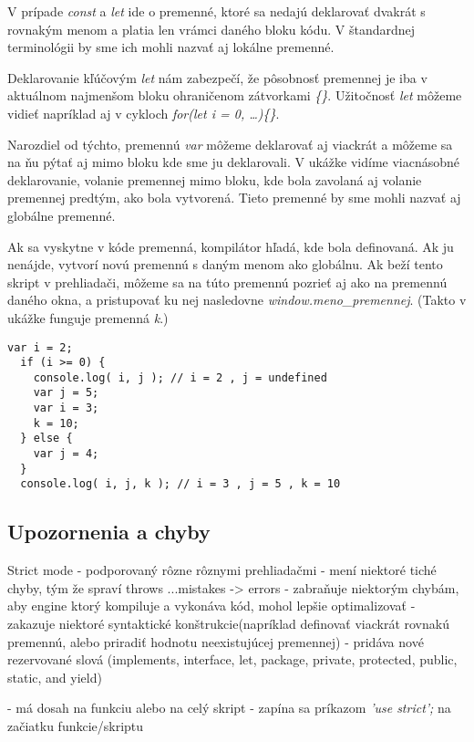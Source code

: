 V prípade \emph{const} a \emph{let} ide o premenné, ktoré sa nedajú deklarovať dvakrát s rovnakým menom a platia len vrámci daného bloku kódu. V štandardnej terminológii by sme ich mohli nazvať aj lokálne premenné. 

Deklarovanie kľúčovým \emph{let} nám zabezpečí, že pôsobnosť premennej je iba v aktuálnom najmenšom bloku ohraničenom zátvorkami \emph{\{\}}. Užitočnosť \emph{let} môžeme vidieť napríklad aj v cykloch \emph{for(let i = 0, \ldots)\{\}}.

Narozdiel od týchto, premennú \emph{var} môžeme deklarovať aj viackrát a môžeme sa na ňu pýtať aj mimo bloku kde sme ju deklarovali. V ukážke vidíme viacnásobné deklarovanie, volanie premennej mimo bloku, kde bola zavolaná aj volanie premennej predtým, ako bola vytvorená. Tieto premenné by sme mohli nazvať aj globálne premenné. 

Ak sa vyskytne v kóde premenná, kompilátor hľadá, kde bola definovaná. Ak ju nenájde, vytvorí novú premennú s daným menom ako globálnu. Ak beží tento skript v prehliadači, môžeme sa na túto premennú pozrieť aj ako na premennú daného okna, a pristupovať ku nej nasledovne \emph{window.meno\_premennej}. (Takto v ukážke funguje premenná \emph{k}.)

\begin{lstlisting}[caption=JavaScript deklarovanie]
  var i = 2;
  if (i >= 0) {
    console.log( i, j ); // i = 2 , j = undefined
    var j = 5;
    var i = 3;
    k = 10;
  } else {
    var j = 4;
  }
  console.log( i, j, k ); // i = 3 , j = 5 , k = 10
\end{lstlisting}


\subsection{Upozornenia a chyby}
\TODO
Strict mode
- podporovaný rôzne rôznymi prehliadačmi
- mení niektoré tiché chyby, tým že spraví throws  ...mistakes -> errors%
- zabraňuje niektorým chybám, aby engine ktorý kompiluje a vykonáva kód, mohol lepšie optimalizovať
- zakazuje niektoré syntaktické konštrukcie(napríklad definovať viackrát rovnakú premennú, alebo priradiť hodnotu neexistujúcej premennej)
- pridáva nové rezervované slová (implements, interface, let, package, private, protected, public, static, and yield)

- má dosah na funkciu alebo na celý skript
- zapína sa príkazom \emph{'use strict';} na začiatku funkcie/skriptu

